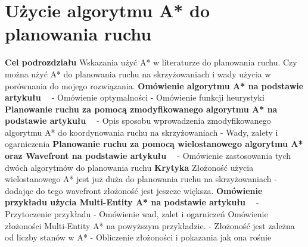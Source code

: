 \section{Użycie algorytmu A* do planowania ruchu}

\textbf{Cel podrozdziału}
\newline
Wskazania użyć A* w literaturze do planowania ruchu. Czy można użyć A* do planowania ruchu na skrzyżowaniach i wady użycia w porównania do mojego rozwiązania.
\newline
\newline
\textbf{Omówienie algorytmu A* na podstawie artykułu ~\cite{dechter1985generalized}}
  \newline
  - Omówienie optymalności
  \newline
  - Omówienie funkcji heurystyki
\newline
\newline
\textbf{Planowanie ruchu za pomocą zmodyfikowanego algorytmu A* na podstawie artykułu ~\cite{munteanmobile}}
  \newline
  - Opis sposobu wprowadzenia zmodyfikowanego algorytmu A* do koordynowania ruchu na skrzyżowaniach
  \newline
  - Wady, zalety i ogarniczenia
\newline
\newline
\textbf{Planowanie ruchu za pomocą wielostanowego algorytmu A* oraz Wavefront na podstawie artykułu ~\cite{wojnicki2015robust}}
\newline
- Omówienie zastosowania tych dwóch algorytmów do planowania ruchu
\newline
\textbf{Krytyka}
\newline
Złożoność użycia wielostanowego A* jest już duża do planowania ruchu na skrzyżowaniach - dodając do tego wavefront złożoność jest jeszcze większa.
\newline
\newline
\textbf{Omówienie przykładu użycia Multi-Entity A* na podstawie artykułu ~\cite{wojnicki2015robust}}
  \newline
  - Przytoczenie przykładu
  \newline
  - Omówienie wad, zalet i ogarniczeń
  \newline
  \newline
Omówienie złożoności Multi-Entity A* na powyższym przykładzie.
  \newline
  - Złożoność jest zależna od liczby stanów w A*
  \newline
  - Obliczenie złożoności i pokazania jak ona rośnie
